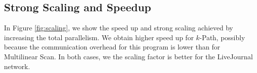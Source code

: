   

\subsection{Strong Scaling and Speedup}
\label{sec:strong-scaling}
In Figure \ref{fig:scaling}, we show the speed up and strong scaling achieved by increasing the total parallelism. We obtain higher speed up for $k$-Path, possibly because the communication overhead for this program is lower than for Multilinear Scan. In both cases, we the scaling factor is better for the LiveJournal network.

